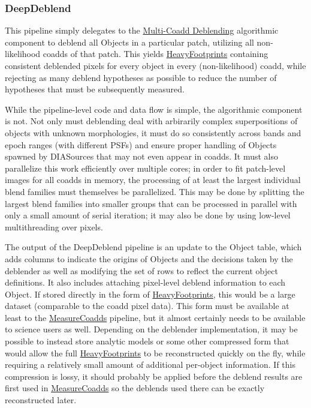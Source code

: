 \subsubsection{DeepDeblend}
\label{sec:drpDeepDeblend}

This pipeline simply delegates to the \hyperref[sec:acMultiCoaddDeblending]{Multi-Coadd Deblending} algorithmic component to deblend all Objects in a particular patch, utilizing all non-likelihood coadds of that patch.  This yields \hyperref[sec:spFootprintsHeavy]{HeavyFootprints} containing consistent deblended pixels for every object in every (non-likelihood) coadd, while rejecting as many deblend hypotheses as possible to reduce the number of hypotheses that must be subsequently measured.

While the pipeline-level code and data flow is simple, the algorithmic component is not.  Not only must deblending deal with arbirarily complex superpositions of objects with unknown morphologies, it must do so consistently across bands and epoch ranges (with different PSFs) and ensure proper handling of Objects spawned by DIASources that may not even appear in coadds.  It must also parallelize this work efficiently over multiple cores; in order to fit patch-level images for all coadds in memory, the processing of at least the largest individual blend families must themselves be parallelized.  This may be done by splitting the largest blend families into smaller groups that can be processed in parallel with only a small amount of serial iteration; it may also be done by using low-level multithreading over pixels.

The output of the DeepDeblend pipeline is an update to the Object table, which adds columns to indicate the origins of Objects and the decisions taken by the deblender as well as modifying the set of rows to reflect the current object definitions.  It also includes attaching pixel-level deblend information to each Object.  If stored directly in the form of \hyperref[sec:spFootprintsHeavy]{HeavyFootprints}, this would be a large dataset (comparable to the coadd pixel data).  This form must be available at least to the \hyperref[sec:drpMeasureCoadds]{MeasureCoadds} pipeline, but it almost certainly needs to be available to science users as well.  Depending on the deblender implementation, it may be possible to instead store analytic models or some other compressed form that would allow the full \hyperref[sec:drpFootprintsHeavy]{HeavyFootprints} to be reconstructed quickly on the fly, while requiring a relatively small amount of additional per-object information.  If this compression is lossy, it should probably be applied before the deblend results are first used in \hyperref[sec:drpMeasureCoadds]{MeasureCoadds} so the deblends used there can be exactly reconstructed later.

